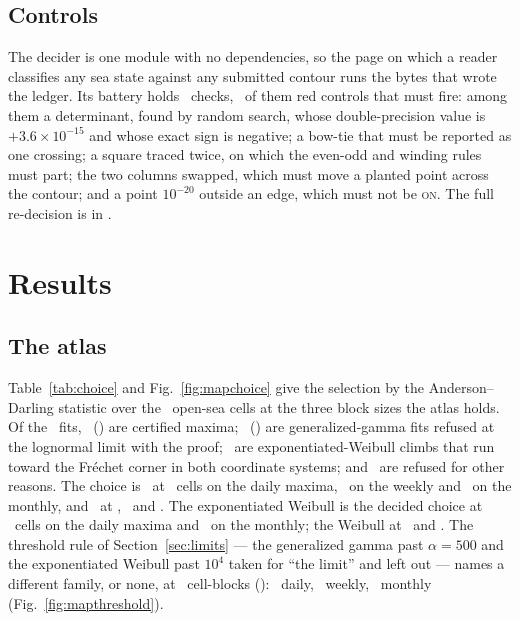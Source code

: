 \documentclass[preprint,11pt,authoryear]{elsarticle}
\begin{document}
\subsection{Controls}
The decider is one module with no dependencies, so the page on which a reader classifies any sea state against any submitted contour runs the bytes that wrote the ledger. Its battery holds \EBatteryChecks\ checks, \EBatteryReds\ of them red controls that must fire: among them a determinant, found by random search, whose double-precision value is $+3.6\times10^{-15}$ and whose exact sign is negative; a bow-tie that must be reported as one crossing; a square traced twice, on which the even-odd and winding rules must part; the two columns swapped, which must move a planted point across the contour; and a point $10^{-20}$ outside an edge, which must not be \textsc{on}. The full re-decision is in \citet{toledo2026ec}.

\section{Results}\label{sec:results}

\subsection{The atlas}\label{sec:atlas}
Table~\ref{tab:choice} and Fig.~\ref{fig:mapchoice} give the selection by the Anderson--Darling statistic over the \ACells\ open-sea cells at the three block sizes the atlas holds. Of the \AFits\ fits, \ACertified\ (\ACertifiedPct) are certified maxima; \AGGLimit\ (\AGGLimitPct) are generalized-gamma fits refused at the lognormal limit with the proof; \AEwStop\ are exponentiated-Weibull climbs that run toward the Fr\'echet corner in both coordinate systems; and \AOther\ are refused for other reasons. The choice is \vDecided\ at \ADecidedDaily\ cells on the daily maxima, \ADecidedWeekly\ on the weekly and \ADecidedMonthly\ on the monthly, and \vRefused\ at \ARefusedChoiceDaily, \ARefusedChoiceWeekly\ and \ARefusedChoiceMonthly. The exponentiated Weibull is the decided choice at \AEwDaily\ cells on the daily maxima and \AEwMonthly\ on the monthly; the Weibull at \AWeibullDaily\ and \AWeibullMonthly. The threshold rule of Section~\ref{sec:limits} --- the generalized gamma past $\alpha = 500$ and the exponentiated Weibull past $10^4$ taken for ``the limit'' and left out --- names a different family, or none, at \ANaiveDiff\ cell-blocks (\ANaiveDiffPct): \ANaiveDiffDaily\ daily, \ANaiveDiffWeekly\ weekly, \ANaiveDiffMonthly\ monthly (Fig.~\ref{fig:mapthreshold}).
\end{document}
